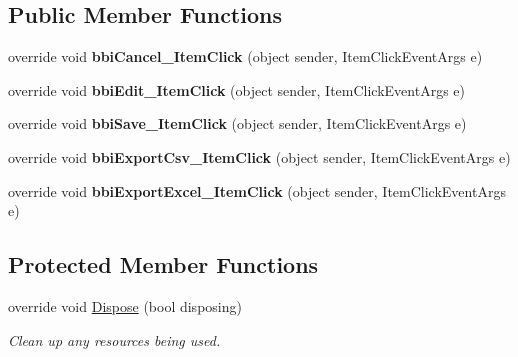 \subsection*{Public Member Functions}
\begin{DoxyCompactItemize}
\item 
\mbox{\label{class_h_k_supply_1_1_forms_1_1_supply_1_1_supply_materials_1_1_quality_control_pending_ad8c2ca5fa36a97d9430985ede0f6dfd3}} 
override void {\bfseries bbi\+Cancel\+\_\+\+Item\+Click} (object sender, Item\+Click\+Event\+Args e)
\item 
\mbox{\label{class_h_k_supply_1_1_forms_1_1_supply_1_1_supply_materials_1_1_quality_control_pending_a22cdd3e371d02ab126463e8bce0026fd}} 
override void {\bfseries bbi\+Edit\+\_\+\+Item\+Click} (object sender, Item\+Click\+Event\+Args e)
\item 
\mbox{\label{class_h_k_supply_1_1_forms_1_1_supply_1_1_supply_materials_1_1_quality_control_pending_a255a54a2f14812d5bc902693cfbc9b38}} 
override void {\bfseries bbi\+Save\+\_\+\+Item\+Click} (object sender, Item\+Click\+Event\+Args e)
\item 
\mbox{\label{class_h_k_supply_1_1_forms_1_1_supply_1_1_supply_materials_1_1_quality_control_pending_a4d1d9ebc16764613be7af849963cf313}} 
override void {\bfseries bbi\+Export\+Csv\+\_\+\+Item\+Click} (object sender, Item\+Click\+Event\+Args e)
\item 
\mbox{\label{class_h_k_supply_1_1_forms_1_1_supply_1_1_supply_materials_1_1_quality_control_pending_ac7d46e96b181c3ac4afda83abf2826dc}} 
override void {\bfseries bbi\+Export\+Excel\+\_\+\+Item\+Click} (object sender, Item\+Click\+Event\+Args e)
\end{DoxyCompactItemize}
\subsection*{Protected Member Functions}
\begin{DoxyCompactItemize}
\item 
override void \mbox{\hyperlink{class_h_k_supply_1_1_forms_1_1_supply_1_1_supply_materials_1_1_quality_control_pending_aba1df8d428e1f4b44f9d96bcde7cc59b}{Dispose}} (bool disposing)
\begin{DoxyCompactList}\small\item\em Clean up any resources being used. \end{DoxyCompactList}\end{DoxyCompactItemize}
